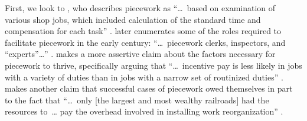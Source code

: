 \documentclass[trackingWork]{subfiles}
\begin{document}


First, we look to
\citeauthor{10.2307/23702539},
who describes piecework as
    ``\dots~based on examination of various shop jobs,
    which included calculation of the standard time and compensation for each task''
\cite{10.2307/23702539}.
\citeauthor{10.2307/23702539} later enumerates some of the roles required
to facilitate piecework in the early  century:
    ``\dots~piecework clerks, inspectors, and ``experts''\dots''
\cite{10.2307/23702539}.
\citeauthor{Brown01041990} makes a more assertive
claim about the factors necessary for piecework to thrive,
specifically arguing that
    ``\dots~incentive pay is less likely in jobs with
    a variety of duties than in jobs with a narrow set of routinized duties''
\cite{Brown01041990}.
\citeauthor{10.2307/23702539} makes another claim that
successful cases of piecework owed themselves in part to the fact that
    ``\dots~only [the largest and most wealthy railroads] had the resources to~\dots
    pay the overhead involved in installing work reorganization''
\cite{10.2307/23702539}.
\end{document}
